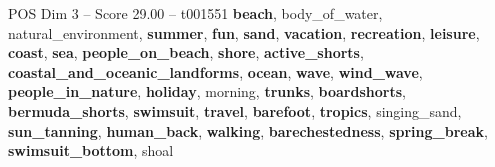 \begin{textsample}{POS Dim 3 – Score 29.00 – t001551}  \label{ex:f3_pos_008}
\textbf{beach}, body\_of\_water, natural\_environment, \textbf{summer}, \textbf{fun}, \textbf{sand}, \textbf{vacation}, \textbf{recreation}, \textbf{leisure}, \textbf{coast}, \textbf{sea}, \textbf{people\_on\_beach}, \textbf{shore}, \textbf{active\_shorts}, \textbf{coastal\_and\_oceanic\_landforms}, \textbf{ocean}, \textbf{wave}, \textbf{wind\_wave}, \textbf{people\_in\_nature}, \textbf{holiday}, morning, \textbf{trunks}, \textbf{boardshorts}, \textbf{bermuda\_shorts}, \textbf{swimsuit}, \textbf{travel}, \textbf{barefoot}, \textbf{tropics}, singing\_sand, \textbf{sun\_tanning}, \textbf{human\_back}, \textbf{walking}, \textbf{barechestedness}, \textbf{spring\_break}, \textbf{swimsuit\_bottom}, shoal

\end{textsample}
